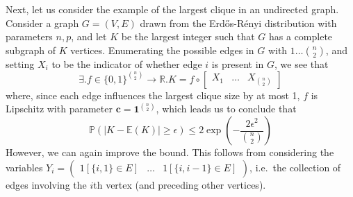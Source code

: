 	Next, let us consider the example of the largest clique in an undirected graph. 
	Consider a graph $G = (V, E)$ drawn from the Erd\H{o}s-R\'enyi distribution with parameters
	$n,p$, and let $K$ be the largest integer such that $G$ has a complete subgraph of $K$
	vertices. Enumerating the possible edges in $G$ with $1 \hdots \binom{n}{2}$, and setting 
	$X_i$ to be the indicator of whether edge $i$ is present in $G$, we see that
	$$		
		\exists. f \in \{0,1\}^{\binom n 2} \rightarrow \mathbb{R} . 
		K = f \circ \begin{bmatrix} X_1 & \hdots & X_{\binom n 2 } \end{bmatrix}
	$$
	where, since each edge influences  the largest clique size by at most 1, $f$ is Lipschitz 
	with parameter $\mathbf{c} = \mathbf{1}^{\binom n 2}$, which leads us to conclude that 
	$$
		\mathbb{P}(|K - \mathbb{E}(K)| \geq \epsilon) \leq
		2 \exp\left(- \frac{2\epsilon^2}{\binom n 2}\right)
	$$
	However, we can again improve the bound. This follows from considering the variables
	$Y_i = \begin{pmatrix} 1[\{i,1\} \in E] & \hdots & 1[\{i, i-1\} \in E] \end{pmatrix}$,
	i.e.\ the collection of edges involving the $i$th vertex (and preceding other vertices).


